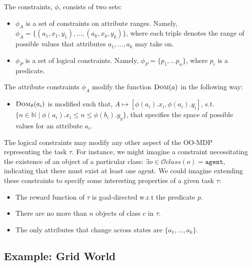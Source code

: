 \documentclass[11pt]{article}
\begin{document}
The constraints, $\phi$, consists of two sets:

\begin{itemize}
\item $\phi_{A}$ is a set of constraints on attribute ranges. Namely, $\phi_{A} = \{ (a_1, x_1, y_1), \ldots, (a_k, x_k, y_k) \}$, where each triple denotes the range of possible values that attributes $a_1, \ldots, a_k$ may take on.
\item $\phi_{P}$ is a set of logical constraints. Namely, $\phi_P = \{p_1, \ldots p_n\}$, where $p_i$ is a predicate.
\end{itemize}

The attribute constraints $\phi_A$ modify the function $\textsc{Dom}(a)$ in the following way:

\begin{itemize}
\item $\textsc{Dom}_\theta(a_i)$ is modified such that, $A \mapsto [\phi(a_i).x_i,\phi(a_i).y_i]$, s.t. $\{n \in \mathbb{N} \mid \phi(a_i).x_i \leq n \leq \phi(b_i).y_y \}$, that specifies the space of possible values for an attribute $a_i$.
\end{itemize}

The logical constraints may modify any other aspect of the OO-MDP representing the task $\tau$. For instance, we might imagine a constraint necessitating the existence of an object of a particular class: $\exists o \in \mathcal{O} class(o) = \texttt{agent}$, indicating that there must exist at least one agent. We could imagine extending these constraints to specify some interesting properties of a given task $\tau$:

\begin{itemize}
\item The reward function of $\tau$ is goal-directed w.r.t the predicate $p$.
\item There are no more than $n$ objects of class $c$ in $\tau$.
\item The only attributes that change across states are $\{a_1, \ldots, a_k\}$.
\end{itemize}

\subsection{Example: Grid World}
\end{document}
